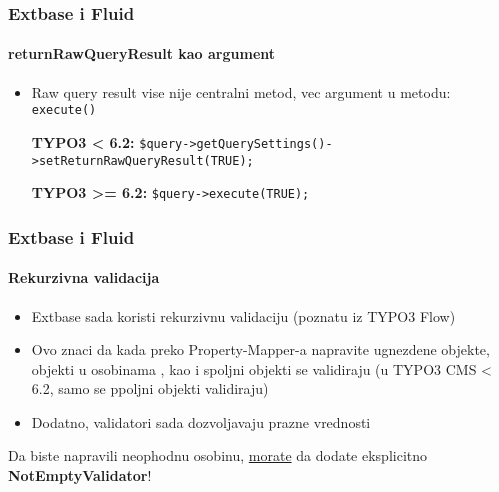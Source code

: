 
\begin{frame}[fragile]
	\frametitle{Extbase i Fluid}
	\framesubtitle{returnRawQueryResult kao argument}

	\lstset{
		basicstyle=\smaller\ttfamily
	}

	\begin{itemize}
		\item Raw query result vise nije centralni metod,\newline
			vec argument u metodu: \texttt{execute()}
			\newline

			\smaller\textbf{TYPO3 < 6.2:}\normalsize\newline
			\lstinline!$query->getQuerySettings()->setReturnRawQueryResult(TRUE);!
			\newline

			\smaller\textbf{TYPO3 >= 6.2:}\normalsize\newline
			\lstinline!$query->execute(TRUE);!

	\end{itemize}

\end{frame}


\begin{frame}[fragile]
	\frametitle{Extbase i Fluid}
	\framesubtitle{Rekurzivna validacija}

	\begin{itemize}
		\item Extbase sada koristi rekurzivnu validaciju (poznatu iz TYPO3 Flow)
		\item Ovo znaci da kada preko Property-Mapper-a napravite ugnezdene objekte,
			objekti u osobinama , kao i spoljni objekti se validiraju\newline
			(u TYPO3 CMS < 6.2, samo se ppoljni objekti validiraju)
		\item Dodatno, validatori sada dozvoljavaju prazne vrednosti
	\end{itemize}

	\breakingchange

	\smaller\begin{center} Da biste napravili neophodnu osobinu, \underline{morate} da dodate eksplicitno \textbf{NotEmptyValidator}!\end{center}\normalsize

\end{frame}

